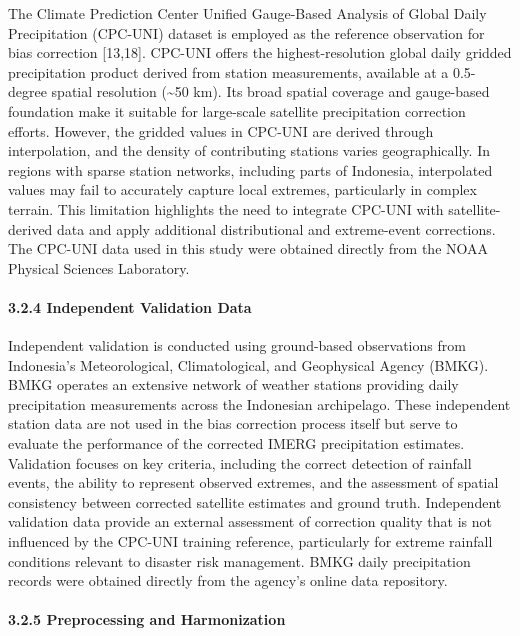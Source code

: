 \documentclass[
]{article}
\begin{document}
The Climate Prediction Center Unified Gauge-Based Analysis of Global
Daily Precipitation (CPC-UNI) dataset is employed as the reference
observation for bias correction {[}13,18{]}. CPC-UNI offers the
highest-resolution global daily gridded precipitation product derived
from station measurements, available at a 0.5-degree spatial resolution
(\textasciitilde50 km). Its broad spatial coverage and gauge-based
foundation make it suitable for large-scale satellite precipitation
correction efforts. However, the gridded values in CPC-UNI are derived
through interpolation, and the density of contributing stations varies
geographically. In regions with sparse station networks, including parts
of Indonesia, interpolated values may fail to accurately capture local
extremes, particularly in complex terrain. This limitation highlights
the need to integrate CPC-UNI with satellite-derived data and apply
additional distributional and extreme-event corrections. The CPC-UNI
data used in this study were obtained directly from the NOAA Physical
Sciences Laboratory.

\paragraph{3.2.4 Independent Validation
Data}\label{independent-validation-data}

Independent validation is conducted using ground-based observations from
Indonesia's Meteorological, Climatological, and Geophysical Agency
(BMKG). BMKG operates an extensive network of weather stations providing
daily precipitation measurements across the Indonesian archipelago.
These independent station data are not used in the bias correction
process itself but serve to evaluate the performance of the corrected
IMERG precipitation estimates. Validation focuses on key criteria,
including the correct detection of rainfall events, the ability to
represent observed extremes, and the assessment of spatial consistency
between corrected satellite estimates and ground truth. Independent
validation data provide an external assessment of correction quality
that is not influenced by the CPC-UNI training reference, particularly
for extreme rainfall conditions relevant to disaster risk management.
BMKG daily precipitation records were obtained directly from the
agency's online data repository.

\paragraph{3.2.5 Preprocessing and
Harmonization}\label{preprocessing-and-harmonization}
\end{document}
